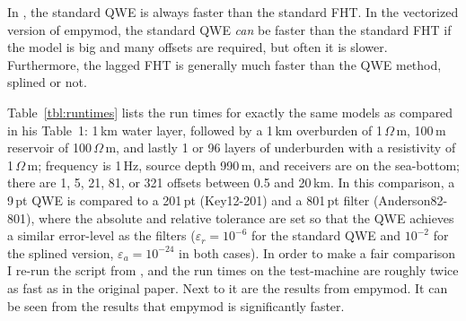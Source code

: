 \documentclass[manuscript,revised]{geophysics}
\begin{document}
In \cite{GEO.12.Key}, the standard QWE is always faster than the standard FHT.
In the vectorized version of empymod, the standard QWE \emph{can} be faster
than the standard FHT if the model is big and many offsets are required, but
often it is slower. Furthermore, the lagged FHT is generally much faster than
the QWE method, splined or not.

Table~\ref{tbl:runtimes} lists the run times for exactly the same models as
\cite{GEO.12.Key} compared in his Table~1: 1\,km water layer, followed by a
1\,km overburden of 1\,$\Omega\,$m, 100\,m reservoir of 100\,$\Omega\,$m, and
lastly 1 or 96 layers of underburden with a resistivity of 1\,$\Omega\,$m;
frequency is 1\,Hz, source depth 990\,m, and receivers are on the sea-bottom;
there are 1, 5, 21, 81, or 321 offsets between 0.5 and 20\,km. In this
comparison, a 9\,pt QWE is compared to a 201\,pt (Key12-201) and a 801\,pt
filter (Anderson82-801), where the absolute and relative tolerance are set so
that the QWE achieves a similar error-level as the filters ($\varepsilon_r =
10^{-6}$ for the standard QWE and $10^{-2}$ for the splined version,
$\varepsilon_a = 10^{-24}$ in both cases). In order to make a fair comparison I
re-run the script from \cite{GEO.12.Key}, and the run times on the test-machine
are roughly twice as fast as in the original paper. Next to it are the results
from empymod. It can be seen from the results that empymod is significantly
faster.%
%
%
\end{document}
